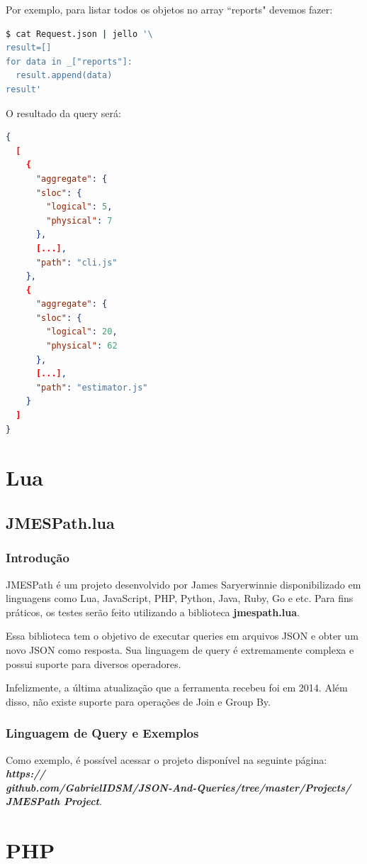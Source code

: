 \documentclass[a4paper, 12pt] {article}
\begin{document}
				Por exemplo, para listar todos os objetos no array “reports" devemos fazer:
\begin{lstlisting}[language=bash]
$ cat Request.json | jello '\
result=[]
for data in _["reports"]:
  result.append(data)
result'
\end{lstlisting}

				\newpage O resultado da query será:
\begin{lstlisting}[language=json,firstnumber=1]
{
  [
    {
      "aggregate": {
      "sloc": {
        "logical": 5,
        "physical": 7
      },
      [...],
      "path": "cli.js"
    },
    {
      "aggregate": {
      "sloc": {
        "logical": 20,
        "physical": 62
      },
      [...],
      "path": "estimator.js"
    }
  ]
}
\end{lstlisting}
	\newpage \section{Lua}
		\subsection{JMESPath.lua}
			\subsubsection{Introdução}
				JMESPath é um projeto desenvolvido por James Saryerwinnie disponibilizado em linguagens como Lua, JavaScript, PHP, Python, Java, Ruby, Go e etc. Para fins práticos, os testes serão feito utilizando a biblioteca \textbf{jmespath.lua}.

				Essa biblioteca tem o objetivo de executar queries em arquivos JSON e obter um novo JSON como resposta. Sua linguagem de query é extremamente complexa e possui suporte para diversos operadores.

				Infelizmente, a última atualização que a ferramenta recebeu foi em 2014. Além disso, não existe suporte para operações de Join e Group By.
			\subsubsection{Linguagem de Query e Exemplos}
				Como exemplo, é possível acessar o projeto disponível na seguinte página: \textbf{\textit{https://\\github.com/GabrielIDSM/JSON-And-Queries/tree/master/Projects/\\JMESPath Project}}.
	
	\newpage \section{PHP}
\end{document}
